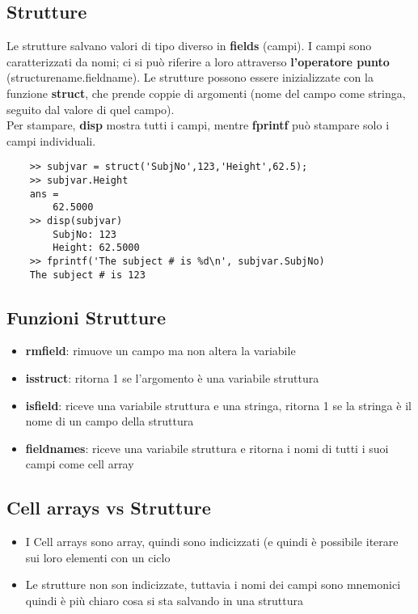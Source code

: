 \documentclass[a4paper, 10pt]{article}
\begin{document}
\subsection{Strutture}
Le strutture salvano valori di tipo diverso in \textbf{fields} (campi).
I campi sono caratterizzati da nomi; ci si può riferire a loro attraverso \textbf{l'operatore punto} (structurename.fieldname).
Le strutture possono essere inizializzate con la funzione \textbf{struct}, che prende coppie di argomenti (nome del campo come stringa, seguito dal valore di quel campo).\\
Per stampare, \textbf{disp} mostra tutti i campi, mentre \textbf{fprintf} può stampare solo i campi individuali.
\begin{lstlisting}
	>> subjvar = struct('SubjNo',123,'Height',62.5);
	>> subjvar.Height
	ans =
		62.5000
	>> disp(subjvar)
		SubjNo: 123
		Height: 62.5000
	>> fprintf('The subject # is %d\n', subjvar.SubjNo)
	The subject # is 123
\end{lstlisting}

\subsection{Funzioni Strutture}
\begin{itemize}
\item \textbf{rmfield}: rimuove un campo ma non altera la variabile
\item \textbf{isstruct}: ritorna 1 se l'argomento è una variabile struttura
\item \textbf{isfield}: riceve una variabile struttura e una stringa, ritorna 1 se la stringa è il nome di un campo della struttura
\item \textbf{fieldnames}: riceve una variabile struttura e ritorna i nomi di tutti i suoi campi come cell array
\end{itemize}

\subsection{Cell arrays vs Strutture}
\begin{itemize}
\item I Cell arrays sono array, quindi sono indicizzati (e quindi è possibile iterare sui loro elementi con un ciclo
\item Le strutture non son indicizzate, tuttavia i nomi dei campi sono mnemonici quindi è più chiaro cosa si sta salvando in una struttura
\end{itemize}
\end{document}
